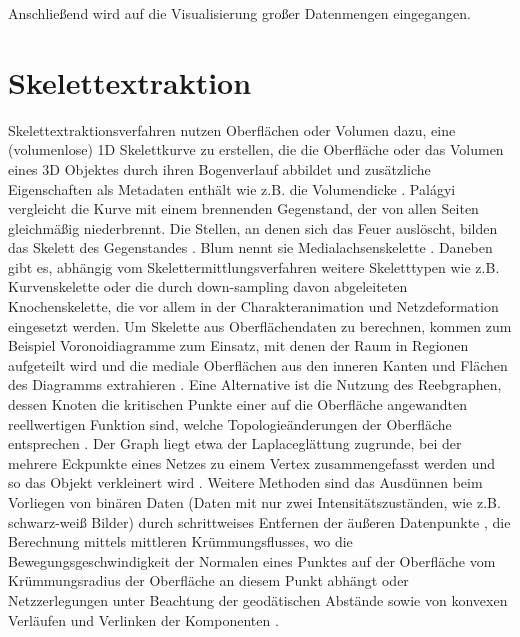 Anschließend wird auf die Visualisierung großer Datenmengen eingegangen.

\section{Skelettextraktion}
Skelettextraktionsverfahren nutzen Oberflächen oder Volumen dazu, eine (volumenlose) 1D Skelettkurve zu erstellen, die die Oberfläche oder das Volumen eines 3D Objektes durch ihren Bogenverlauf abbildet und zusätzliche Eigenschaften als Metadaten enthält wie z.B. die Volumendicke \cite{au2008skeletonExtractionbyMeshContraction}. Palágyi vergleicht die Kurve mit einem brennenden Gegenstand, der von allen Seiten gleichmäßig niederbrennt. Die Stellen, an denen sich das Feuer auslöscht, bilden das Skelett des Gegenstandes \cite{palagyi2008parallelSurfaceThinning}. Blum nennt sie Medialachsenskelette \cite{blum1967descriptorsOfShape}. Daneben gibt es, abhängig vom Skelettermittlungsverfahren weitere Skeletttypen wie z.B. Kurvenskelette \cite{dey2006CurveSkeletonsMedialGeodesicFunction} \cite{cornea2007curveSkeletonProperties} oder die durch down-sampling davon abgeleiteten Knochenskelette, die vor allem in der Charakteranimation \cite{wang2007envelopingRotiationalRegression} und Netzdeformation \cite{weber2007contextAwareSkeletalShapeDeformation} eingesetzt werden.
Um Skelette aus Oberflächendaten zu berechnen, kommen zum Beispiel Voronoidiagramme zum Einsatz, mit denen der Raum in Regionen aufgeteilt wird und die mediale Oberflächen aus den inneren Kanten und Flächen des Diagramms extrahieren \cite{dey2006CurveSkeletonsMedialGeodesicFunction}. Eine Alternative ist die Nutzung des Reebgraphen, dessen Knoten die kritischen Punkte einer auf die Oberfläche angewandten reellwertigen Funktion sind, welche Topologieänderungen der Oberfläche entsprechen \cite{pascucci2007computationReebGraph}. Der Graph liegt etwa der Laplaceglättung zugrunde, bei der mehrere Eckpunkte eines Netzes zu einem Vertex zusammengefasst werden und so das Objekt verkleinert wird \cite{au2008skeletonExtractionbyMeshContraction}. Weitere Methoden sind das Ausdünnen beim Vorliegen von binären Daten (Daten mit nur zwei Intensitätszuständen, wie z.B. schwarz-weiß Bilder) durch schrittweises Entfernen der äußeren Datenpunkte \cite{palagyi2008parallelSurfaceThinning}, die Berechnung mittels mittleren Krümmungsflusses, wo die Bewegungsgeschwindigkeit der Normalen eines Punktes auf der Oberfläche vom Krümmungsradius der Oberfläche an diesem Punkt abhängt \cite{tagliasacchi2012meanCurvatureSkeletons} oder Netzzerlegungen unter Beachtung der geodätischen Abstände sowie von konvexen Verläufen und Verlinken der Komponenten \cite{katz2003meshDecomposition}.
